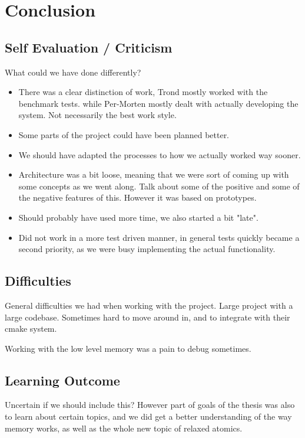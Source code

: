 \chapter{Conclusion}
\label{chap:conclusion}

\section{Self Evaluation / Criticism}
What could we have done differently?
\begin{itemize}
    \item
    There was a clear distinction of work, Trond mostly worked with the benchmark tests.
    while Per-Morten mostly dealt with actually developing the system.
    Not necessarily the best work style.

    \item
    Some parts of the project could have been planned better.

    \item
    We should have adapted the processes to how we actually worked way sooner.

    \item
    Architecture was a bit loose, meaning that we were sort of coming up with some concepts as we went along. Talk about some of the positive and some of the negative features of this.
    However it was based on prototypes.

    \item
    Should probably have used more time, we also started a bit "late".

    \item
    Did not work in a more test driven manner, in general tests quickly became a second priority,
    as we were busy implementing the actual functionality.
\end{itemize}

\section{Difficulties}
General difficulties we had when working with the project.
Large project with a large codebase. Sometimes hard to move around in, and to integrate with their cmake system.

Working with the low level memory was a pain to debug sometimes.

\section{Learning Outcome}
Uncertain if we should include this?
However part of goals of the thesis was also to learn about certain topics,
and we did get a better understanding of the way memory works, as well as the whole new topic of relaxed atomics.
